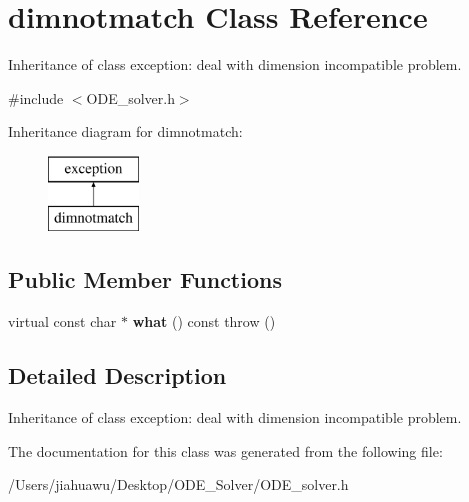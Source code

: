 \hypertarget{classdimnotmatch}{}\section{dimnotmatch Class Reference}
\label{classdimnotmatch}


Inheritance of class exception\+: deal with dimension incompatible problem.  




{\ttfamily \#include $<$O\+D\+E\+\_\+solver.\+h$>$}

Inheritance diagram for dimnotmatch\+:\begin{figure}[H]
\begin{center}
\leavevmode
\includegraphics[height=2.000000cm]{classdimnotmatch}
\end{center}
\end{figure}
\subsection*{Public Member Functions}
\begin{DoxyCompactItemize}
\item 
\mbox{\label{classdimnotmatch_af8ab958cff29859339d5493960a0c444}} 
virtual const char $\ast$ {\bfseries what} () const  throw ()
\end{DoxyCompactItemize}


\subsection{Detailed Description}
Inheritance of class exception\+: deal with dimension incompatible problem. 

The documentation for this class was generated from the following file\+:\begin{DoxyCompactItemize}
\item 
/\+Users/jiahuawu/\+Desktop/\+O\+D\+E\+\_\+\+Solver/O\+D\+E\+\_\+solver.\+h\end{DoxyCompactItemize}
